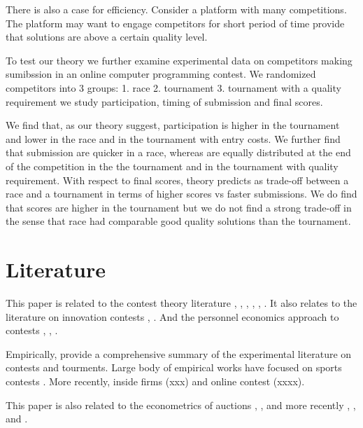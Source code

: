There is also a case for efficiency. Consider a platform with many
competitions. The platform may want to engage competitors for short
period of time provide that solutions are above a certain quality level.

To test our theory we further examine experimental data on competitors
making sumibssion in an online computer programming contest. We
randomized competitors into 3 groups: 1. race 2. tournament 3.
tournament with a quality requirement we study participation, timing of
submission and final scores.

We find that, as our theory suggest, participation is higher in the
tournament and lower in the race and in the tournament with entry costs.
We further find that submission are quicker in a race, whereas are
equally distributed at the end of the competition in the the tournament
and in the tournament with quality requirement. With respect to final
scores, theory predicts as trade-off between a race and a tournament in
terms of higher scores vs faster submissions. We do find that scores are
higher in the tournament but we do not find a strong trade-off in the
sense that race had comparable good quality solutions than the
tournament.

\section{Literature}\label{literature}

This paper is related to the contest theory literature
\citet{dixit1987strategic} \citet{baye2003strategic},
\citet{parreiras2010contests}, \citet{moldovanu2001optimal},
\citet{moldovanu2006contest}, \citet{siegel2009all},
\citet{siegel2014contests}. It also relates to the literature on
innovation contests \citet{taylor1995digging}, \citet{che2003optimal}.
And the personnel economics approach to contests \citet{lazear1981rank},
\citet{green1983comparison}, \citet{mary1984economic}.

Empirically, \citet{dechenaux2014survey} provide a comprehensive summary
of the experimental literature on contests and tourments. Large body of
empirical works have focused on sports contests
\citet{szymanski2003economic}. More recently, inside firms (xxx) and
online contest (xxxx).

This paper is also related to the econometrics of auctions
\citet{paarsch1992deciding}, \citet{laffont1995econometrics},
\citet{donald1996identification} and more recently
\citet{athey2011comparing}, \citet{athey2002identification}, and
\citet{athey2007nonparametric}.

